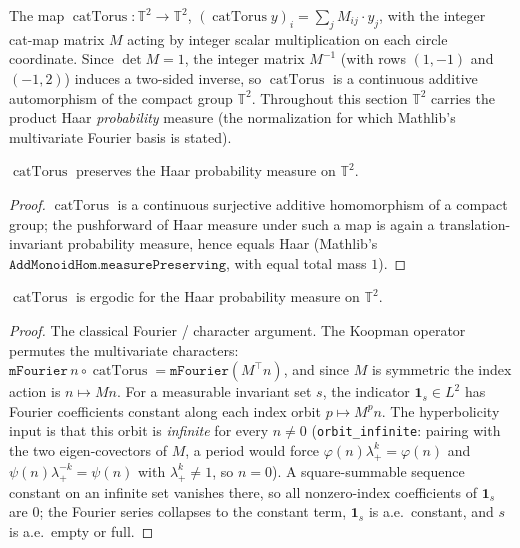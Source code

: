 \begin{definition}\label{catTorus}
  \leanok
  The map \(\operatorname{catTorus}:\mathbb{T}^2\to\mathbb{T}^2\),
  \((\operatorname{catTorus} y)_i = \sum_j M_{ij}\cdot y_j\), with the integer cat-map matrix
  \(M\) acting by integer scalar multiplication on each circle coordinate. Since \(\det M = 1\), the
  integer matrix \(M^{-1}\) (with rows \((1,-1)\) and \((-1,2)\)) induces a two-sided
  inverse, so \(\operatorname{catTorus}\) is a continuous additive automorphism of the compact
  group \(\mathbb{T}^2\). Throughout this section \(\mathbb{T}^2\) carries the product Haar
  \emph{probability} measure (the normalization for which Mathlib's multivariate Fourier basis is
  stated).
\end{definition}

\begin{proposition}\label{measurePreserving_catTorus}
  \leanok
  \(\operatorname{catTorus}\) preserves the Haar probability measure on \(\mathbb{T}^2\).
\end{proposition}
\begin{proof}\leanok
  \(\operatorname{catTorus}\) is a continuous surjective additive homomorphism of a compact
  group; the pushforward of Haar measure under such a map is again a translation-invariant
  probability measure, hence equals Haar (Mathlib's
  \(\texttt{AddMonoidHom.measurePreserving}\), with equal total mass \(1\)).
\end{proof}

\begin{theorem}\label{ergodic_catTorus}
  \leanok
  \(\operatorname{catTorus}\) is ergodic for the Haar probability measure on \(\mathbb{T}^2\).
\end{theorem}
\begin{proof}\leanok
  The classical Fourier / character argument. The Koopman operator permutes the multivariate
  characters: \(\texttt{mFourier}\,n\circ\operatorname{catTorus} = \texttt{mFourier}(M^{\top}n)\),
  and since \(M\) is symmetric the index action is \(n\mapsto M n\). For a measurable invariant
  set \(s\), the indicator \(\mathbf 1_s\in L^2\) has Fourier coefficients constant along each
  index orbit \(p\mapsto M^{p}n\). The hyperbolicity input is that this orbit is \emph{infinite}
  for every \(n\ne 0\) (\texttt{orbit\_infinite}: pairing with the two
  eigen-covectors of \(M\), a period would force \(\varphi(n)\lambda_+^{k} = \varphi(n)\) and
  \(\psi(n)\lambda_+^{-k} = \psi(n)\) with \(\lambda_+^k\ne 1\), so \(n = 0\)). A square-summable
  sequence constant on an infinite set vanishes there, so all nonzero-index coefficients of
  \(\mathbf 1_s\) are \(0\); the Fourier series collapses to the constant term, \(\mathbf 1_s\)
  is a.e.\ constant, and \(s\) is a.e.\ empty or full.
\end{proof}

